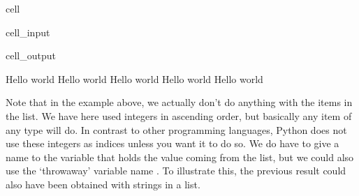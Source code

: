 \documentclass[letterpaper,10pt,english]{jupyterBook}
\begin{document}
\begin{sphinxuseclass}{cell}\begin{sphinxVerbatimInput}

\begin{sphinxuseclass}{cell_input}
\begin{sphinxVerbatim}[commandchars=\\\{\}]
   \PYG{p}{[}    \PYG{p}{]}
\end{sphinxVerbatim}

\end{sphinxuseclass}\end{sphinxVerbatimInput}
\begin{sphinxVerbatimOutput}

\begin{sphinxuseclass}{cell_output}
\begin{sphinxVerbatim}[commandchars=\\\{\}]
Hello world
Hello world
Hello world
Hello world
Hello world
\end{sphinxVerbatim}

\end{sphinxuseclass}\end{sphinxVerbatimOutput}

\end{sphinxuseclass}
\sphinxAtStartPar
Note that in the example above, we actually don’t do anything with the items in the list. We have here used integers in ascending order, but basically any item of any type will do. In contrast to other programming languages, Python does not use these integers as indices unless you want it to do so. We do have to give a name to the variable that holds the value coming from the list, but we could also use the ‘throwaway’ variable name \sphinxcode{\sphinxupquote{\_}}. To illustrate this, the previous result could also have been obtained with strings in a list.
\end{document}
